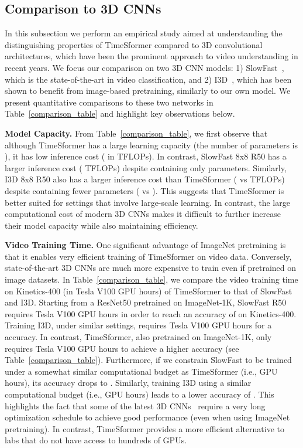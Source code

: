 \documentclass{article}
\begin{document}
\subsection{Comparison to 3D CNNs}
\label{comparison_sec}

In this subsection we perform an empirical study aimed at understanding the distinguishing properties of TimeSformer compared to 3D convolutional architectures, which have been the prominent approach to video understanding in recent years. We focus our comparison on two 3D CNN models: 1) SlowFast~\cite{slowfast}, which is the state-of-the-art in video classification, and 2) I3D~\cite{DBLP:conf/cvpr/CarreiraZ17}, which has been shown to benefit from image-based pretraining, similarly to our own model. We present quantitative comparisons to these two networks in Table~\ref{comparison_table} and highlight key observations below.

\textbf{Model Capacity.} From Table~\ref{comparison_table}, we first observe that although TimeSformer has a large learning capacity (the number of parameters is ), it has low inference cost ( in TFLOPs).  In contrast, SlowFast 8x8 R50 has a larger inference cost ( TFLOPs) despite containing only  parameters. Similarly, I3D 8x8 R50 also has a larger inference cost than TimeSformer ( vs  TFLOPs) despite containing fewer parameters ( vs ). This suggests that TimeSformer is better suited for settings that involve large-scale learning. In contrast, the large computational cost of modern 3D CNNs makes it difficult to further increase their model capacity while also maintaining efficiency.

\textbf{Video Training Time.} One significant advantage of ImageNet pretraining is that it enables very efficient training of TimeSformer on video data. Conversely, state-of-the-art 3D CNNs are much more expensive to train even if pretrained on image datasets. In Table~\ref{comparison_table}, we compare the video training time on Kinetics-400 (in Tesla V100 GPU hours) of TimeSformer to that of SlowFast and I3D. Starting from a ResNet50 pretrained on ImageNet-1K, SlowFast  R50 requires  Tesla V100 GPU hours in order to reach an accuracy of  on Kinetics-400. Training I3D, under similar settings, requires  Tesla V100 GPU hours for a  accuracy. In contrast, TimeSformer, also pretrained on ImageNet-1K, only requires  Tesla V100 GPU hours to achieve a higher  accuracy (see Table~\ref{comparison_table}). Furthermore, if we constrain SlowFast to be trained under a somewhat similar computational budget as TimeSformer (i.e.,  GPU hours), its accuracy drops to . Similarly, training I3D using a similar computational budget (i.e.,  GPU hours) leads to a lower accuracy of . This highlights the fact that some of the latest 3D CNNs~\cite{slowfast,feichtenhofer2020x3d} require a very long optimization schedule to achieve good performance (even when using ImageNet pretraining). In contrast, TimeSformer provides a more efficient alternative to labs that do not have access to hundreds of GPUs.
\end{document}
